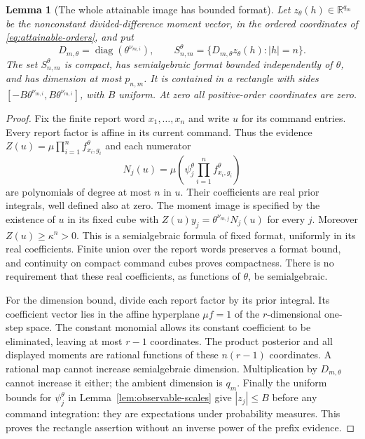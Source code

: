 \documentclass[11pt]{amsart}
\newtheorem{lemma}[theorem]{Lemma}
\theoremstyle{definition}\newtheorem{definition}[theorem]{Definition}
\theoremstyle{remark}\newtheorem{remark}[theorem]{Remark}
\newcommand{\R}{\mathbb R}\newcommand{\N}{\mathbb N}\newcommand{\C}{\mathbb C}
\begin{document}
\begin{lemma}[The whole attainable image has bounded format]\label{lem:attainable-format}
Let $z_\theta(h)\in\R^{q_m}$ be the nonconstant divided-difference
moment vector, in the ordered coordinates of
\eqref{eq:attainable-orders}, and put
\[
 D_{m,\theta}=\operatorname{diag}(\theta^{\nu_{m,i}}),\qquad
 S_{n,m}^\theta=\{D_{m,\theta}z_\theta(h):|h|=n\}.
\]
The set $S_{n,m}^\theta$ is compact, has semialgebraic format bounded
independently of $\theta$, and has dimension at most $p_{n,m}$.
It is contained in a rectangle with sides
$[-B\theta^{\nu_{m,i}},B\theta^{\nu_{m,i}}]$, with $B$ uniform.
At zero all positive-order coordinates are zero.
\end{lemma}
\begin{proof}
Fix the finite report word $x_1,\ldots,x_n$ and write $u$ for its
command entries. Every report factor is affine in its current command.
Thus the evidence
$Z(u)=\mu\prod_{i=1}^n f_{x_i,g_i}^\theta$ and each numerator
\[
 N_j(u)=\mu\left(\psi_j^\theta
                   \prod_{i=1}^n f_{x_i,g_i}^\theta\right)
\]
are polynomials of degree at most $n$ in $u$. Their coefficients are
real prior integrals, well defined also at zero. The moment image is
specified by the existence of $u$ in its fixed cube with
$Z(u)y_j=\theta^{\nu_{m,j}}N_j(u)$ for every $j$.
Moreover $Z(u)\ge\kappa^n>0$. This is a semialgebraic formula of
fixed format, uniformly in its real coefficients. Finite union over the
report words preserves a format bound, and continuity on compact command
cubes proves compactness. There is no requirement that these real
coefficients, as functions of $\theta$, be semialgebraic.

For the dimension bound, divide each report factor by its prior
integral. Its coefficient vector lies in the affine hyperplane
$\mu f=1$ of the $r$-dimensional one-step space. The constant monomial
allows its constant coefficient to be eliminated, leaving at most $r-1$
coordinates. The product posterior and all displayed moments are rational
functions of these $n(r-1)$ coordinates. A rational map cannot increase
semialgebraic dimension. Multiplication by $D_{m,\theta}$ cannot increase
it either; the ambient dimension is $q_m$. Finally the uniform bounds
for $\psi_j^\theta$ in Lemma~\ref{lem:observable-scales} give
$|z_j|\le B$ before any command integration: they are expectations under
probability measures. This proves the rectangle assertion without an
inverse power of the prefix evidence.
\end{proof}
\end{document}
